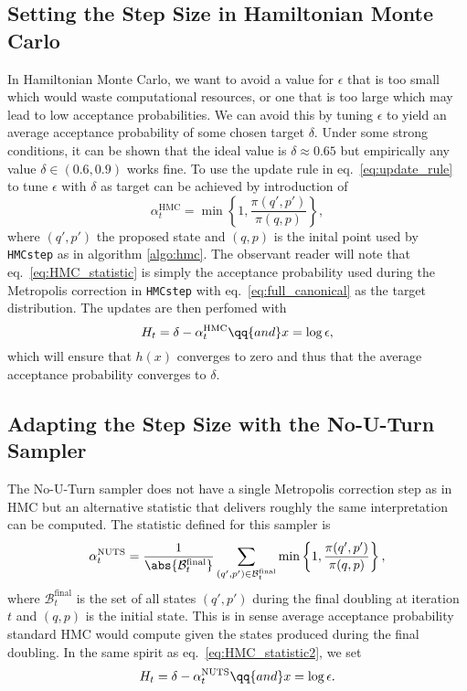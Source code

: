 \subsection{Setting the Step Size in Hamiltonian Monte Carlo}
In Hamiltonian Monte Carlo, we want to avoid a value for $\epsilon$ that is too small which would waste computational resources, or one that is too large which may lead to low acceptance probabilities. We can avoid this by tuning $\epsilon$ to yield an average acceptance probability of some chosen target $\delta$. Under some strong conditions, it can be shown that the ideal value is $\delta \approx 0.65$ \cite{neal2011} but empirically any value $\delta \in (0.6, 0.9)$ works fine. To use the update rule in eq.~\eqref{eq:update_rule} to tune $\epsilon$ with $\delta$ as target can be achieved by introduction of
\begin{equation}\label{eq:HMC_statistic}
    \alpha_t^\text{HMC} = \min \left\{1, \frac{\pi(q', p')}{\pi(q, p)}\right\},
\end{equation}
where $(q', p')$ the proposed state and $(q, p)$ is the inital point used by {\tt HMCstep} as in algorithm \ref{algo:hmc}.
The observant reader will note that eq.~\eqref{eq:HMC_statistic} is simply the acceptance probability used during the Metropolis correction in {\tt HMCstep} with eq.~\eqref{eq:full_canonical} as the target distribution. The updates are then perfomed with
\begin{equation}\label{eq:HMC_statistic2}
    H_t = \delta - \alpha_t^\text{HMC} \qq{and} x = \log \epsilon,
\end{equation}
which will ensure that $h(x)$ converges to zero and thus that the average acceptance probability converges to $\delta$.

\subsection{Adapting the Step Size with the No-U-Turn Sampler}
The No-U-Turn sampler does not have a single Metropolis correction step as in HMC but an alternative statistic that delivers roughly the same interpretation can be computed. The statistic defined for this sampler is
\begin{equation}\label{eq:NUTS_statistic}
    \alpha_t^\text{NUTS} = \frac{1}{\abs{\mathcal{B}_t^\text{final}}} \sum_{(q', p') \in \mathcal{B}_t^\text{final}} \min \left\{1, \frac{\pi(q', p')}{\pi(q, p)}\right\},
\end{equation}
where $\mathcal{B}_t^\text{final}$ is the set of all states $(q', p')$ during the final doubling at iteration $t$ and $(q, p)$ is the initial state. This is in sense average acceptance probability standard HMC would compute given the states produced during the final doubling. In the same spirit as eq.~\eqref{eq:HMC_statistic2}, we set
\begin{equation}\label{eq:NUTS_statistic2}
    H_t = \delta - \alpha_t^\text{NUTS} \qq{and} x = \log \epsilon.
\end{equation}

